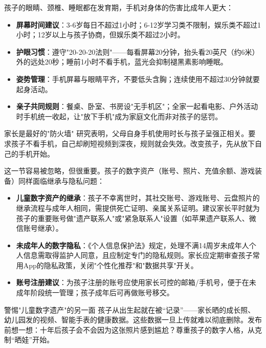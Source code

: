 
孩子的眼睛、颈椎、睡眠都在发育期，手机对身体的伤害比成年人更大：

\begin{itemize}
  \item \textbf{屏幕时间建议}：3-6岁每日不超过1小时；6-12岁学习类不限制，娱乐类不超过1小时；12岁以上与孩子协商，但娱乐类不超过2小时。
  \item \textbf{护眼习惯}：遵守"20-20-20法则"——每看屏幕20分钟，抬头看20英尺（约6米）外的远处20秒；睡前1小时不看手机，蓝光会抑制褪黑素影响睡眠。
  \item \textbf{姿势管理}：手机屏幕与眼睛平齐，不要低头含胸；连续使用不超过30分钟就要起身活动。
  \item \textbf{亲子共同规则}：餐桌、卧室、书房设"无手机区"；全家一起看电影、户外活动时手机统一收起，让"放下手机"成为家庭文化而非对孩子的惩罚。
\end{itemize}

\begin{tcbinfo}{家长是最好的"防火墙"}
研究表明，父母自身手机使用时长与孩子呈强正相关。要求孩子不看手机，自己却刷短视频到深夜，规则就会失效。改变孩子，先从放下自己的手机开始。

\end{tcbinfo}


这一节容易被忽略，但很重要。孩子的数字资产（账号、照片、充值余额、游戏装备）同样面临继承与隐私问题：

\begin{itemize}
  \item \textbf{儿童数字资产的继承}：孩子不幸离世时，其社交账号、游戏账号、云盘照片的继承流程与成年人相同，需提供死亡证明、亲属关系证明。建议家长平时就为孩子的重要账号做"遗产联系人"或"紧急联系人"设置（如苹果遗产联系人、微信账号继承）。
  \item \textbf{未成年人的数字隐私}：《个人信息保护法》规定，处理不满14周岁未成年人个人信息需取得监护人同意，且应制定专门的隐私规则。家长应定期审查孩子常用App的隐私政策，关闭"个性化推荐"和"数据共享"开关。
  \item \textbf{账号注册建议}：为孩子注册的账号应使用家长可控的邮箱/手机号，便于在未成年阶段统一管理；孩子成年后可再做账号移交。
\end{itemize}

\begin{tcbwarn}{警惕"儿童数字遗产"的另一面}
孩子从出生起就在被“记录”——家长晒的成长照、幼儿园发的视频、智能手表的健康数据。这些数据一旦上传就难以彻底删除。发布前想一想：十年后孩子会不会因为这张照片感到尴尬？尊重孩子的数字人格，从克制“晒娃”开始。

\end{tcbwarn}

